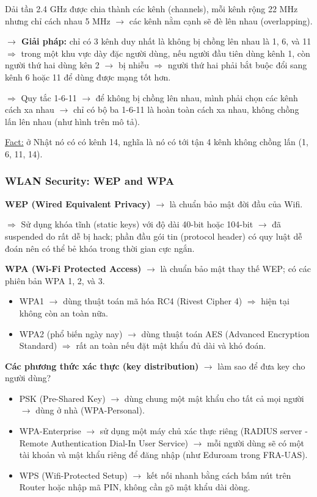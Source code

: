 \noindent
Dải tần 2.4 GHz được chia thành các kênh (channels), mỗi kênh rộng 22 MHz nhưng chỉ cách nhau 5 MHz $\rightarrow$ các kênh nằm cạnh sẽ đè lên nhau (overlapping).
\medskip

\noindent
\textbf{$\rightarrow$ Giải pháp:} chỉ có 3 kênh duy nhất là không bị chồng lên nhau là 1, 6, và 11 $\Rightarrow$ trong một khu vực dày đặc người dùng, nếu người đầu tiên dùng kênh 1, còn người thứ hai dùng kên 2 $\rightarrow$ bị nhiễu $\Rightarrow$ người thứ hai phải bắt buộc đổi sang kênh 6 hoặc 11 để dùng được mạng tốt hơn.

$\Rightarrow$ Quy tắc 1-6-11 $\rightarrow$ để không bị chồng lên nhau, mình phải chọn các kênh cách xa nhau $\rightarrow$ chỉ có bộ ba 1-6-11 là hoàn toàn cách xa nhau, không chồng lấn lên nhau (như hình trên mô tả).
\medskip

\noindent
\underline{Fact:} ở Nhật nó có có kênh 14, nghĩa là nó có tới tận 4 kênh không chồng lấn (1, 6, 11, 14).
\medskip

\subsubsection{WLAN Security: WEP and WPA}

\noindent
\textbf{WEP (Wired Equivalent Privacy)} $\rightarrow$ là chuẩn bảo mật đời đầu của Wifi.

$\Rightarrow$ Sử dụng khóa tĩnh (static keys) với độ dài 40-bit hoặc 104-bit $\rightarrow$ đã suspended do rất dễ bị hack; phần đầu gói tin (protocol header) có quy luật dễ đoán nên có thể bẻ khóa trong thời gian cực ngắn.
\medskip

\noindent
\textbf{WPA (Wi-Fi Protected Access)} $\rightarrow$ là chuẩn bảo mật thay thế WEP; có các phiên bản WPA 1, 2, và 3.

\begin{itemize}
    \item WPA1 $\rightarrow$ dùng thuật toán mã hóa RC4 (Rivest Cipher 4) $\Rightarrow$ hiện tại không còn an toàn nữa.
    \item WPA2 (phổ biến ngày nay) $\rightarrow$ dùng thuật toán AES (Advanced Encryption Standard) $\Rightarrow$ rất an toàn nếu đặt mật khẩu đủ dài và khó đoán.
\end{itemize}

\noindent
\textbf{Các phương thức xác thực (key distribution)} $\rightarrow$ làm sao để đưa key cho người dùng?

\begin{itemize}
    \item PSK (Pre-Shared Key) $\rightarrow$ dùng chung một mật khẩu cho tất cả mọi người $\rightarrow$ dùng ở nhà (WPA-Personal).
    \item WPA-Enterprise $\rightarrow$ sử dụng một máy chủ xác thực riêng (RADIUS server - Remote Authentication Dial-In User Service) $\rightarrow$ mỗi người dùng sẽ có một tài khoản và mật khẩu riêng để đăng nhập (như Eduroam trong FRA-UAS).
    \item WPS (Wifi-Protected Setup) $\rightarrow$ kết nối nhanh bằng cách bấm nút trên Router hoặc nhập mã PIN, không cần gõ mật khẩu dài dòng.
\end{itemize}

